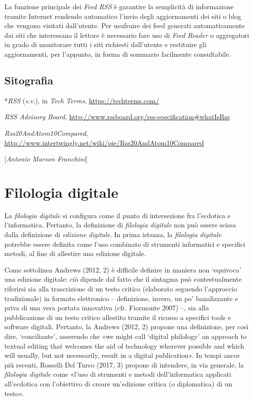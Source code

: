 {La funzione principale dei \emph{Feed RSS} è garantire la semplicità di
informazione tramite Internet rendendo automatico l'invio degli
aggiornamenti dei siti o blog che vengono visitati dall'utente. Per
usufruire dei feed generati automaticamente dai siti che interessano il
lettore è necessario fare uso di \emph{Feed Reader} o aggregatori in
grado di monitorare tutti i siti richiesti dall'utente e restituire gli
aggiornamenti, per l'appunto, in forma di sommario facilmente
consultabile.

\section*{Sitografia}
{\parindent0pt 
*\emph{RSS} (\emph{s.v}.), in \emph{Tech Terms},
\url{https://techterms.com/}

\emph{RSS Advisory Board},
\url{http://www.rssboard.org/rss-specification\#whatIsRss}

\emph{Rss20AndAtom10Compared},
\url{http://www.intertwingly.net/wiki/pie/Rss20AndAtom10Compared}
}

\hrulefill 

{[}\emph{Antonio Marson Franchini}{]}




\chapter{Filologia digitale}

La \emph{filologia} \emph{digitale} si configura come il punto di
intersezione fra l'ecdotica e l'informatica. Pertanto, la definizione di
\emph{filologia digitale} non può essere scissa dalla definizione di
\emph{edizione digitale}. In prima istanza, la \emph{filologia digitale}
potrebbe essere definita come l'uso combinato di strumenti informatici e
specifici metodi, al fine di allestire una edizione digitale.

Come sottolinea Andrews (2012, 2) è difficile definire in maniera non
`equivoca' una edizione digitale: ciò dipende dal fatto che il sintagma
può contestualmente riferirsi sia alla trascrizione di un testo critico
(elaborato seguendo l'approccio tradizionale) in formato elettronico --
definizione, invero, un po' banalizzante e priva di una vera portata
innovativa (cfr. Fiormonte 2007) --, sia alla pubblicazione di un testo
critico allestito tramite il ricorso a specifici tools e software
digitali. Pertanto, la Andrews (2012, 2) propone una definizione, per
così dire, `conciliante', asserendo che «we might call `digital
philology' an approach to textual editing that welcomes the aid of
technology wherever possible and which will usually, but not
necessarily, result in a digital publication». In tempi ancor più
recenti, Rosselli Del Turco (2017, 3) propone di intendere, in via
generale, la \emph{filologia digitale} come «l'uso di strumenti e metodi
dell'informatica applicati all'ecdotica con l'obiettivo di creare
un'edizione critica (o diplomatica) di un testo».

}
